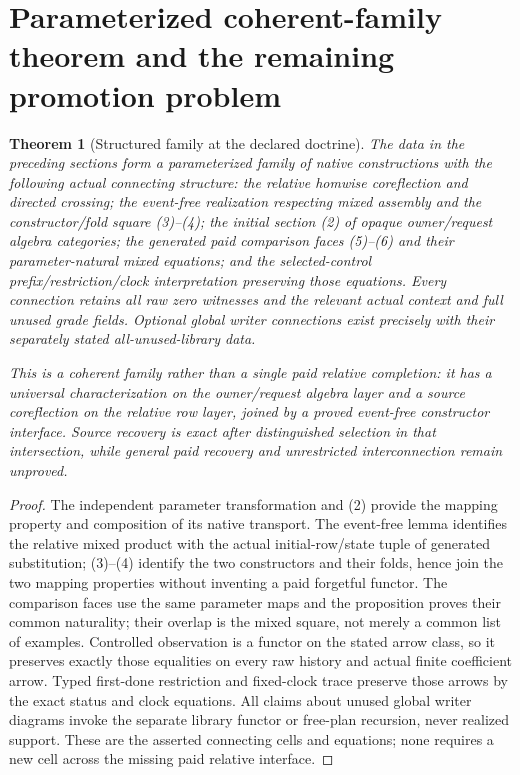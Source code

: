 \documentclass[11pt]{article}
\newtheorem{theorem}{Theorem}\newtheorem{lemma}[theorem]{Lemma}\newtheorem{proposition}[theorem]{Proposition}
\begin{document}
\section{Parameterized coherent-family theorem and the remaining promotion problem}
\begin{theorem}[Structured family at the declared doctrine]
The data in the preceding sections form a parameterized family of native constructions with the following actual connecting structure: the relative homwise coreflection and directed crossing; the event-free realization respecting mixed assembly and the constructor/fold square (3)--(4); the initial section (2) of opaque owner/request algebra categories; the generated paid comparison faces (5)--(6) and their parameter-natural mixed equations; and the selected-control prefix/restriction/clock interpretation preserving those equations. Every connection retains all raw zero witnesses and the relevant actual context and full unused grade fields. Optional global writer connections exist precisely with their separately stated all-unused-library data.

This is a coherent family rather than a single paid relative completion: it has a universal characterization on the owner/request algebra layer and a source coreflection on the relative row layer, joined by a proved event-free constructor interface. Source recovery is exact after distinguished selection in that intersection, while general paid recovery and unrestricted interconnection remain unproved.
\end{theorem}
\begin{proof}
The independent parameter transformation and (2) provide the mapping property and composition of its native transport. The event-free lemma identifies the relative mixed product with the actual initial-row/state tuple of generated substitution; (3)--(4) identify the two constructors and their folds, hence join the two mapping properties without inventing a paid forgetful functor. The comparison faces use the same parameter maps and the proposition proves their common naturality; their overlap is the mixed square, not merely a common list of examples. Controlled observation is a functor on the stated arrow class, so it preserves exactly those equalities on every raw history and actual finite coefficient arrow. Typed first-done restriction and fixed-clock trace preserve those arrows by the exact status and clock equations. All claims about unused global writer diagrams invoke the separate library functor or free-plan recursion, never realized support. These are the asserted connecting cells and equations; none requires a new cell across the missing paid relative interface.
\end{proof}
\end{document}
